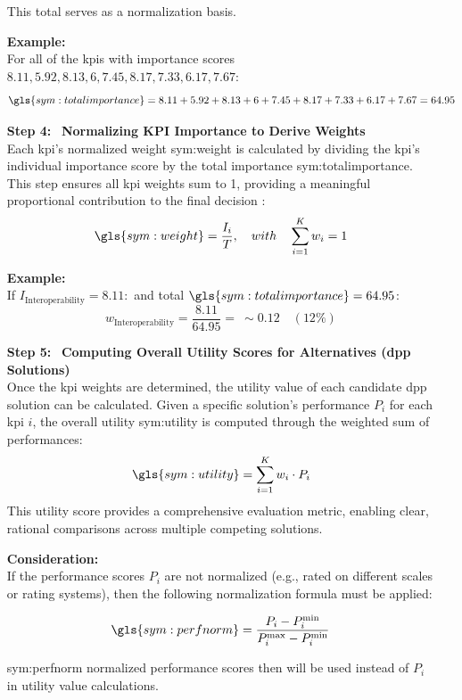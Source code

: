 \begin{enumerate}[itemsep=\baselineskip]
    This total serves as a normalization basis.
    
    \vspace{\baselineskip}
    \textbf{Example:}\\
    For all of the \ac{kpi}s with importance scores \(8.11, 5.92, 8.13, 6, 7.45, 8.17, 7.33, 6.17, 7.67\):
    \[
    \gls{sym:totalimportance} = 8.11 + 5.92 + 8.13 + 6 + 7.45 + 8.17 + 7.33 + 6.17 + 7.67 = 64.95
    \]

    \item[\textbf{Step 4:}] ~\textbf{Normalizing KPI Importance to Derive Weights}\\
    Each \ac{kpi}'s normalized weight \gls{sym:weight} is calculated by dividing the \ac{kpi}'s individual importance score by the total importance \gls{sym:totalimportance}. This step ensures all \ac{kpi} weights sum to 1, providing a meaningful proportional contribution to the final decision \autocite{Belton.2002}:
    \[
    \gls{sym:weight} = \frac{I_i}{T}, \quad with \quad \sum_{i=1}^{K}w_i = 1
    \]
    
    \vspace{\baselineskip}
    \textbf{Example:}\\
    If \(I_{\text{Interoperability}} = 8.11:\) and total \(\gls{sym:totalimportance} = 64.95\):
    \[
    w_{\text{Interoperability}} = \frac{8.11}{64.95} = \: \sim0.12 \quad (12\%)
    \]

    \item[\textbf{Step 5:}] ~\textbf{Computing Overall Utility Scores for Alternatives (\ac{dpp} Solutions)}\\
    Once the \ac{kpi} weights are determined, the utility value of each candidate \ac{dpp} solution can be calculated. Given a specific solution's performance \(P_i\) for each \ac{kpi} \(i\), the overall utility \gls{sym:utility} is computed through the weighted sum of performances:
    \[
    \gls{sym:utility} = \sum_{i=1}^{K}w_i\cdot P_i
    \]
    This utility score provides a comprehensive evaluation metric, enabling clear, rational comparisons across multiple competing solutions.

    \vspace{\baselineskip}
    \textbf{Consideration:}\\
    If the performance scores \(P_i\) are not normalized (e.g., rated on different scales or rating systems), then the following normalization formula must be applied:

    \[
    \gls{sym:perfnorm} = \frac{P_i-P_i^{\min}}{P_i^{\max}-P_i^{\min}}
    \]

    \gls{sym:perfnorm} normalized performance scores then will be used instead of \(P_i\) in utility value calculations.
\end{enumerate}

